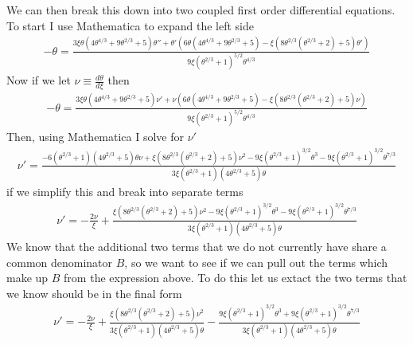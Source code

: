 We can then break this down into two coupled first order differential equations. To start I use Mathematica to expand the left side
{\small
\begin{align*}
    -\theta = \frac{3 \xi  \theta \left(4 \theta^{4/3}+9 \theta^{2/3}+5\right) \theta''+\theta
   '\left(6 \theta\left(4 \theta^{4/3}+9 \theta^{2/3}+5\right)-\xi  \left(8
   \theta^{2/3} \left(\theta^{2/3}+2\right)+5\right) \theta'\right)}{9 \xi\left(\theta^{2/3}+1\right)^{5/2} \theta^{4/3}}
\end{align*}}
Now if we let $\nu\equiv \frac{d\theta}{d\xi}$ then
{\small
\begin{align*}
    -\theta = \frac{3 \xi \theta \left(4 \theta^{4/3}+9 \theta^{2/3}+5\right) \nu'+\nu\left(6 \theta\left(4 \theta^{4/3}+9 \theta^{2/3}+5\right)-\xi \left(8
   \theta^{2/3} \left(\theta^{2/3}+2\right)+5\right) \nu\right)}{9 \xi\left(\theta^{2/3}+1\right)^{5/2} \theta^{4/3}}
\end{align*}}
Then, using Mathematica I solve for $\nu'$
{\small
\begin{align*}
    \nu' = \frac{-6 \left(\theta^{2/3}+1\right) \left(4 \theta^{2/3}+5\right) \theta \nu+\xi\left(8 \theta^{2/3} \left(\theta^{2/3}+2\right)+5\right) \nu^2-9 \xi  \left(\theta^{2/3}+1\right)^{3/2} \theta^3-9 \xi  \left(\theta^{2/3}+1\right)^{3/2} \theta^{7/3}}{3 \xi  \left(\theta^{2/3}+1\right) \left(4 \theta^{2/3}+5\right) \theta}
\end{align*}}
if we simplify this and break into separate terms
\begin{align*}
    \nu' = -\frac{2\nu}{\xi} + \frac{\xi\left(8 \theta^{2/3} \left(\theta^{2/3}+2\right)+5\right) \nu^2-9 \xi  \left(\theta^{2/3}+1\right)^{3/2} \theta^3-9 \xi  \left(\theta^{2/3}+1\right)^{3/2} \theta^{7/3}}{3 \xi  \left(\theta^{2/3}+1\right) \left(4 \theta^{2/3}+5\right) \theta}
\end{align*}
We know that the additional two terms that we do not currently have share a common denominator $B$, so we want to see if we can pull out the terms which make up $B$ from the expression above. To do this let us extact the two terms that we know should be in the final form
\begin{align*}
	\nu' = -\frac{2\nu}{\xi} + \frac{\xi\left(8 \theta^{2/3} \left(\theta^{2/3}+2\right)+5\right) \nu^2}{3 \xi  \left(\theta^{2/3}+1\right) \left(4 \theta^{2/3}+5\right) \theta} - \frac{9 \xi  \left(\theta^{2/3}+1\right)^{3/2} \theta^3+9 \xi  \left(\theta^{2/3}+1\right)^{3/2} \theta^{7/3}}{3 \xi  \left(\theta^{2/3}+1\right) \left(4 \theta^{2/3}+5\right) \theta}
\end{align*}
